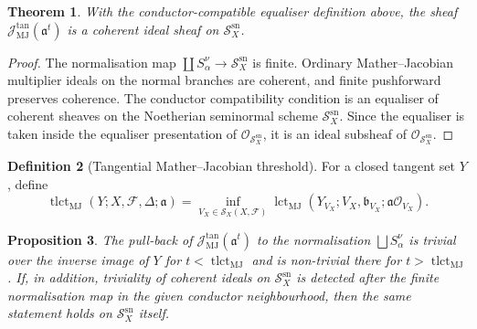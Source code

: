 \documentclass[11pt]{amsart}
\numberwithin{equation}{section}
\theoremstyle{plain}
\newtheorem{Theorem}{Theorem}[section]
\newtheorem{Proposition}[Theorem]{Proposition}
\theoremstyle{definition}
\newtheorem{Definition}[Theorem]{Definition}
\newcommand{\lct}{\operatorname{lct}}
\newcommand{\tlct}{\operatorname{tlct}}
\newcommand{\MJ}{\mathrm{MJ}}
\newcommand{\sn}{\mathrm{sn}}
\newcommand{\bbound}{\mathfrak b}
\newcommand{\cF}{\mathcal F}
\newcommand{\cO}{\mathcal O}
\newcommand{\cJ}{\mathcal J}
\newcommand{\sS}{\mathscr S}
\begin{document}
\begin{Theorem}
\label{thm:coherence}
With the conductor-compatible equaliser definition above, the sheaf $\cJ^{\tan}_{\MJ}(\mathfrak a^t)$ is a coherent ideal sheaf on $\sS_X^{\sn}$.
\end{Theorem}

\begin{proof}
The normalisation map $\coprod S_\alpha^\nu\to\sS_X^{\sn}$ is finite.  Ordinary Mather--Jacobian multiplier ideals on the normal branches are coherent, and finite pushforward preserves coherence.  The conductor compatibility condition is an equaliser of coherent sheaves on the Noetherian seminormal scheme $\sS_X^{\sn}$.  Since the equaliser is taken inside the equaliser presentation of $\cO_{\sS_X^{\sn}}$, it is an ideal subsheaf of $\cO_{\sS_X^{\sn}}$.
\end{proof}

\begin{Definition}[Tangential Mather--Jacobian threshold]
For a closed tangent set $Y$, define
\[
\tlct_{\MJ}(Y;X,\cF,\Delta;\mathfrak a)=
\inf_{V_X\in\mathcal S_X(X,\cF)}\lct_{\MJ}(Y_{V_X};V_X,\bbound_{V_X};\mathfrak a\cO_{V_X}).
\]
\end{Definition}

\begin{Proposition}
\label{prop:threshold-normalisation}
The pull-back of $\cJ^{\tan}_{\MJ}(\mathfrak a^t)$ to the normalisation $ \bigsqcup S_\alpha^\nu$ is trivial over the inverse image of $Y$ for $t<\tlct_{\MJ}$ and is non-trivial there for $t>\tlct_{\MJ}$.  If, in addition, triviality of coherent ideals on $\sS_X^{\sn}$ is detected after the finite normalisation map in the given conductor neighbourhood, then the same statement holds on $\sS_X^{\sn}$ itself.
\end{Proposition}
\end{document}
